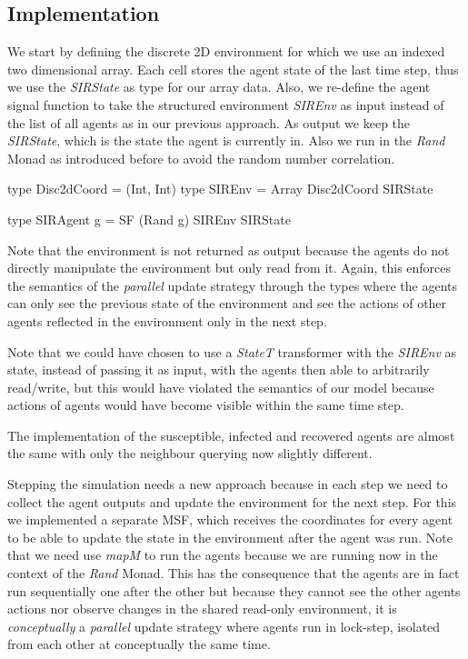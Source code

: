 \subsection{Implementation}
\label{sub:timedriven_thirdstep_impl}
We start by defining the discrete 2D environment for which we use an indexed two dimensional array. Each cell stores the agent state of the last time step, thus we use the \textit{SIRState} as type for our array data. Also, we re-define the agent signal function to take the structured environment \textit{SIREnv} as input instead of the list of all agents as in our previous approach. As output we keep the \textit{SIRState}, which is the state the agent is currently in. Also we run in the \textit{Rand} Monad as introduced before to avoid the random number correlation. 

\begin{HaskellCode}
type Disc2dCoord = (Int, Int)
type SIREnv      = Array Disc2dCoord SIRState

type SIRAgent g  = SF (Rand g) SIREnv SIRState
\end{HaskellCode}

Note that the environment is not returned as output because the agents do not directly manipulate the environment but only read from it. Again, this enforces the semantics of the \textit{parallel} update strategy through the types where the agents can only see the previous state of the environment and see the actions of other agents reflected in the environment only in the next step.

Note that we could have chosen to use a \textit{StateT} transformer with the \textit{SIREnv} as state, instead of passing it as input, with the agents then able to arbitrarily read/write, but this would have violated the semantics of our model because actions of agents would have become visible within the same time step.

The implementation of the susceptible, infected and recovered agents are almost the same with only the neighbour querying now slightly different. 

Stepping the simulation needs a new approach because in each step we need to collect the agent outputs and update the environment for the next step. For this we implemented a separate MSF, which receives the coordinates for every agent to be able to update the state in the environment after the agent was run. Note that we need use \textit{mapM} to run the agents because we are running now in the context of the \textit{Rand} Monad. This has the consequence that the agents are in fact run sequentially one after the other but because they cannot see the other agents actions nor observe changes in the shared read-only environment, it is \textit{conceptually} a \textit{parallel} update strategy where agents run in lock-step, isolated from each other at conceptually the same time.
  
